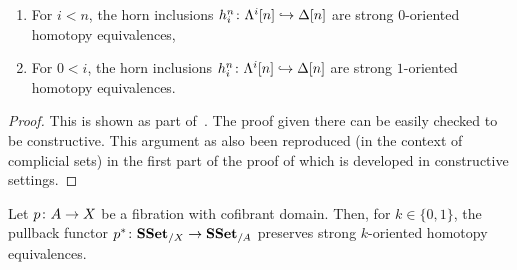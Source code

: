 \documentclass[reqno,10pt,a4paper,oneside,draft]{amsart}
\begin{document}
\begin{lemma}\label{lemma:genTcof_strongHequiv} \hfill 
\begin{enumerate}[$(i)$]
\item For $i < n$, the horn inclusions $h^n_i \colon \Lambda^i[n] \hookrightarrow \Delta[n]$ are strong $0$-oriented homotopy equivalences,
\item For $0 < i $, the horn inclusions $h^n_i \colon \Lambda^i[n] \hookrightarrow \Delta[n]$ are strong $1$-oriented homotopy equivalences.
\end{enumerate}
\end{lemma}

\begin{proof}
This is shown as part of~\cite[Theorem 3.2.3]{joyal-tierney:simplicial-homotopy-theory}. The proof given there can be easily checked to be constructive. This argument as also been reproduced (in the context of complicial sets) in the first part of the proof of \cite[Proposition~5.2.6]{henry2018wms} which is developed in constructive settings.
\end{proof}




\begin{lemma} 
\label{lemma:pb_of_StrongHomotopyEq}
Let $p \colon A \rightarrow X$ be a fibration with cofibrant domain. Then, for $k \in \{0,1\}$, 
the pullback functor $p^* \colon \mathbf{SSet}_{/X} \to \mathbf{SSet}_{/A}$ preserves strong $k$-oriented homotopy equivalences.
\end{lemma}
\end{document}
